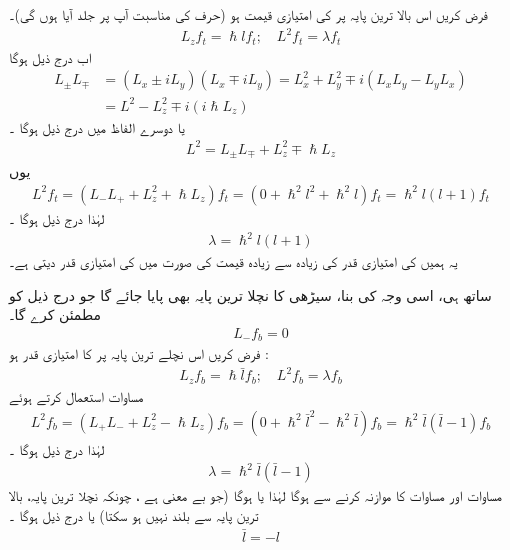فرض کریں اس بالا ترین  پایہ پر  کی امتیازی قیمت  ہو (حرف  کی مناسبت آپ پر جلد آیا ہوں گی)۔ 
\begin{align}
L_z f_t = \hslash l f_{t}; \quad L^2 f_t = \lambda f_t
\end{align}
اب درج ذیل ہوگا 
\begin{align*} 
L_{\pm} L_{\mp}&= (L_x \pm i L_y) (L_x \mp i L_y) = L_x^2 + L_y^2 \mp i (L_x L_y - L_y L_x) \\
&= L^2 - L_z^2 \mp i (i \hslash L_z)
\end{align*}
یا دوسرے الفاظ میں درج ذیل ہوگا ۔
\begin{align}\label{مساوات_تین_ابعادی_مربع_بصورت_رفعت}
L^2 = L_{\pm} L_{\mp} + L_z^2 \mp \hslash L_z
\end{align}
یوں 
\begin{align*}
L^2 f_t = (L_{-} L_{+} + L_z^2 + \hslash L_z) f_t = (0 + \hslash^2 l^2 + \hslash^2 l) f_t = \hslash^2 l (l + 1) f_t
\end{align*}
لہٰذا درج ذیل ہوگا ۔
\begin{align}\label{مساوات_تین_ابعادی_لمڈا_تعلق_الف}
\lambda = \hslash^2 l (l + 1)
\end{align}
یہ ہمیں  کی امتیازی قدر کی زیادہ سے زیادہ قیمت کی صورت میں  کی امتیازی قدر دیتی ہے۔

 ساتھ ہی،  اسی وجہ کی بنا،  سیڑھی کا  نچلا ترین  پایہ  بھی پایا جائے گا جو درج ذیل کو مطمئن کرے گا۔ 
\begin{align}
L_{-} f_b = 0
\end{align}
فرض کریں اس نچلے ترین  پایہ پر  کا امتیازی قدر  ہو :
\begin{align}
L_z f_b = \hslash \bar{l} f_b ; \quad L^2 f_b = \lambda f_b
\end{align}
مساوات  استعمال کرتے ہوئے
\begin{align*}
L^2 f_b = (L_{+} L_{-} + L_z^2 - \hslash L_z ) f_b = (0 + \hslash^2 \bar{l}^{2} - \hslash^2 \bar{l}) f_b = \hslash^2 \bar{l} (\bar{l} - 1) f_b
\end{align*}
لہٰذا درج ذیل ہوگا ۔
\begin{align}\label{مساوات_تین_ابعادی_لمڈا_تعلق_ب}
\lambda = \hslash^2 \bar{l} (\bar{l} - 1)
\end{align}
مساوات    اور مساوات  کا موازنہ کرنے سے  ہوگا لہٰذا یا  ہوگا   (جو بے معنی ہے ، چونکہ نچلا ترین  پایہ، بالا ترین   پایہ سے  بلند نہیں ہو سکتا)  یا درج ذیل ہوگا ۔
\begin{align}
\bar{l} = - l
\end{align}

